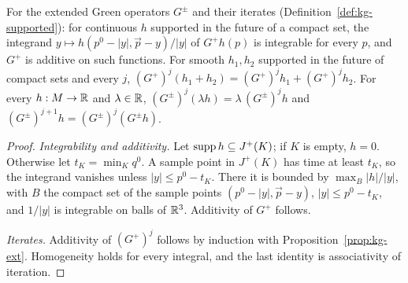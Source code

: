 \begin{lemma}\label{lem:kg-linear}
For the extended Green operators $G^\pm$ and their iterates (Definition~\ref{def:kg-supported}): for
continuous $h$ supported in the future of a compact set, the integrand $y\mapsto
h(p^0-|y|,\vec p-y)/|y|$ of $G^+h(p)$ is integrable for every $p$, and $G^+$ is additive on such
functions. For smooth $h_1,h_2$ supported in the future of compact sets and every $j$,
$(G^+)^j(h_1+h_2)=(G^+)^jh_1+(G^+)^jh_2$. For every $h:M\to\mathbb R$ and $\lambda\in\mathbb R$,
$(G^\pm)^j(\lambda h)=\lambda\,(G^\pm)^jh$ and $(G^\pm)^{j+1}h=(G^\pm)^j(G^\pm h)$.
\end{lemma}
\begin{proof}
\emph{Integrability and additivity.} Let $\operatorname{supp} h\subseteq J^+(K)$; if $K$ is empty, $h=0$.
Otherwise let $t_K=\min_Kq^0$. A sample
point in $J^+(K)$ has time at least $t_K$, so the integrand vanishes unless $|y|\le p^0-t_K$. There it
is bounded by $\max_B|h|/|y|$, with $B$ the compact set of the sample points $(p^0-|y|,\vec p-y)$,
$|y|\le p^0-t_K$, and $1/|y|$ is integrable on balls of $\mathbb R^3$. Additivity of $G^+$ follows.

\emph{Iterates.} Additivity of $(G^+)^j$ follows by induction with Proposition~\ref{prop:kg-ext}. Homogeneity holds for every integral, and the last identity is associativity of iteration.
\end{proof}


